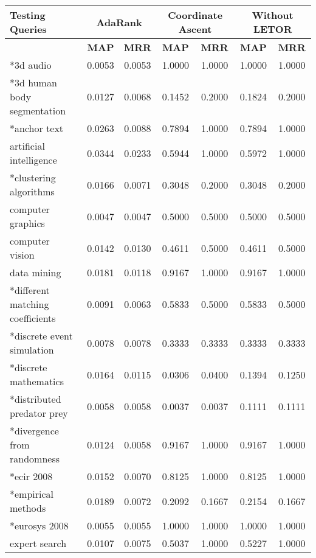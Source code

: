 \begin{table}
\centering
\begin{tabular}{|l|c|c|c|c|c|c|}
\hline \textbf{Testing Queries} & \multicolumn{2}{|c|}{\textbf{AdaRank}} & \multicolumn{2}{|c|}{\textbf{Coordinate Ascent}} & \multicolumn{2}{|c|}{\textbf{Without LETOR}} \\
\hline 				 & \textbf{MAP} & \textbf{MRR}  & \textbf{MAP} & \textbf{MRR}  & \textbf{MAP} & \textbf{MRR} \\
\hline *3d audio & 0.0053 & 0.0053 & 1.0000 & 1.0000 & 1.0000 & 1.0000 \\
\hline *3d human body segmentation & 0.0127 & 0.0068 & 0.1452 & 0.2000 & 0.1824 & 0.2000 \\
\hline *anchor text & 0.0263 & 0.0088 & 0.7894 & 1.0000 & 0.7894 & 1.0000 \\
\hline artificial intelligence & 0.0344 & 0.0233 & 0.5944 & 1.0000 & 0.5972 & 1.0000 \\
\hline *clustering algorithms & 0.0166 & 0.0071 & 0.3048 & 0.2000 & 0.3048 & 0.2000 \\
\hline computer graphics & 0.0047 & 0.0047 & 0.5000 & 0.5000 & 0.5000 & 0.5000 \\
\hline computer vision & 0.0142 & 0.0130 & 0.4611 & 0.5000 & 0.4611 & 0.5000 \\
\hline data mining & 0.0181 & 0.0118 & 0.9167 & 1.0000 & 0.9167 & 1.0000 \\
\hline *different matching coefficients & 0.0091 & 0.0063 & 0.5833 & 0.5000 & 0.5833 & 0.5000 \\
\hline *discrete event simulation & 0.0078 & 0.0078 & 0.3333 & 0.3333 & 0.3333 & 0.3333 \\
\hline *discrete mathematics & 0.0164 & 0.0115 & 0.0306 & 0.0400 & 0.1394 & 0.1250 \\
\hline *distributed predator prey & 0.0058 & 0.0058 & 0.0037 & 0.0037 & 0.1111 & 0.1111 \\
\hline *divergence from randomness & 0.0124 & 0.0058 & 0.9167 & 1.0000 & 0.9167 & 1.0000 \\
\hline *ecir 2008 & 0.0152 & 0.0070 & 0.8125 & 1.0000 & 0.8125 & 1.0000 \\
\hline *empirical methods & 0.0189 & 0.0072 & 0.2092 & 0.1667 & 0.2154 & 0.1667 \\
\hline *eurosys 2008 & 0.0055 & 0.0055 & 1.0000 & 1.0000 & 1.0000 & 1.0000 \\
\hline expert search & 0.0107 & 0.0075 & 0.5037 & 1.0000 & 0.5227 & 1.0000 \\

\end{tabular}
\end{table}
